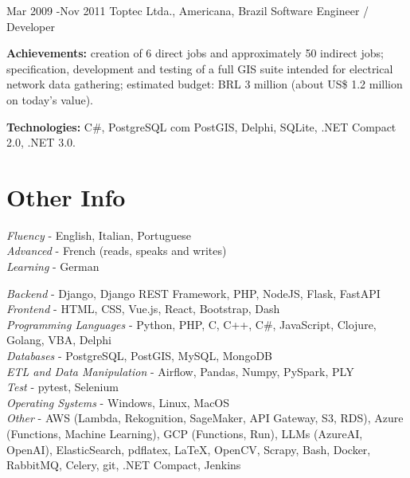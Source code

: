 \documentclass[10pt]{article} %
\begin{document}
\job
{Mar 2009 -}{Nov 2011}
{Toptec Ltda., Americana, Brazil}
{}
{Software Engineer / Developer}
{\rule{0mm}{2mm}\textbf{Achievements:} creation of 6 direct jobs and approximately 50 indirect jobs; specification, development and testing of a full GIS suite intended for electrical network data gathering; estimated budget: BRL 3 million (about US\$ 1.2 million on today’s value). \\
\rule{0mm}{3mm}\textbf{Technologies:} C\#, PostgreSQL com PostGIS, Delphi, SQLite, .NET Compact 2.0, .NET 3.0.}



\section{Other Info}

{
\textit{Fluency} - English, Italian, Portuguese\\
\textit{Advanced} - French (reads, speaks and writes)\\
\textit{Learning} - German\\
}


{
\textit{Backend} - Django, Django REST Framework, PHP, NodeJS, Flask, FastAPI\\
\textit{Frontend} - HTML, CSS, Vue.js, React, Bootstrap, Dash\\
\textit{Programming Languages} - Python, PHP, C, C++, C\#, JavaScript, Clojure, Golang, VBA, Delphi\\
\textit{Databases} - PostgreSQL, PostGIS, MySQL, MongoDB\\
\textit{ETL and Data Manipulation} - Airflow, Pandas, Numpy, PySpark, PLY\\
\textit{Test} - pytest, Selenium\\
\textit{Operating Systems} - Windows, Linux, MacOS\\
\textit{Other} - AWS (Lambda, Rekognition, SageMaker, API Gateway, S3, RDS), Azure (Functions, Machine Learning), GCP (Functions, Run), LLMs (AzureAI, OpenAI), ElasticSearch, pdflatex, LaTeX, OpenCV, Scrapy, Bash, Docker, RabbitMQ, Celery, git, .NET Compact, Jenkins\\
}
\end{document}
